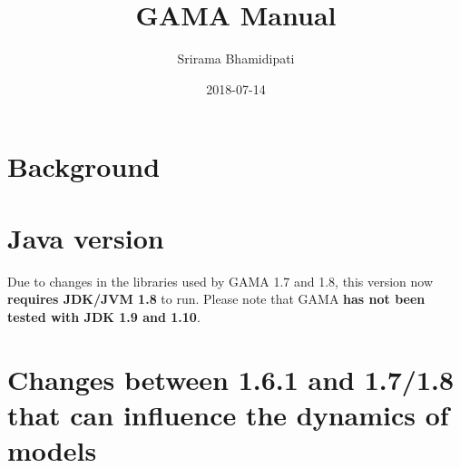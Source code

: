 \documentclass[]{book}
\title{GAMA Manual}
\author{Srirama Bhamidipati}
\date{2018-07-14}
\theoremstyle{definition}
\theoremstyle{definition}
\theoremstyle{definition}
\theoremstyle{remark}
\begin{document}
\maketitle

{
\setcounter{tocdepth}{1}
\tableofcontents
}
\chapter*{Background}\label{background}

\chapter{Java version}\label{java-version}

Due to changes in the libraries used by GAMA 1.7 and 1.8, this version
now \textbf{requires JDK/JVM 1.8} to run. Please note that GAMA
\textbf{has not been tested with JDK 1.9 and 1.10}.

\chapter{Changes between 1.6.1 and 1.7/1.8 that can influence the
dynamics of
models}\label{changes-between-1.6.1-and-1.71.8-that-can-influence-the-dynamics-of-models}
\end{document}

